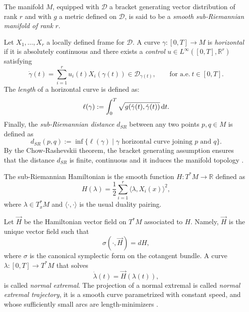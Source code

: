 \documentclass{amsart}
\theoremstyle{plain}
\theoremstyle{definition}
\theoremstyle{remark}
\newcommand{\R}{\mathbb{R}}
\newcommand{\diff}{d}%
\newcommand{\de}{\,{\rm d}}											%
\newcommand{\la}{\langle}
\newcommand{\ra}{\rangle}
\newcommand{\sr}{sub-{R}ie\-man\-nian }
\newcommand{\distr}{\mathcal{D}}								%
\begin{document}
The manifold $M$, equipped with $\distr$ a bracket generating vector distribution of rank $r$ and with $g$ a metric defined on $\distr$, is said to be a \emph{smooth \sr manifold of rank $r$}. 

Let $X_1,\ldots,X_r$ a locally defined frame for $\distr$. 
A curve $\gamma : [0,T] \to M$ is \emph{horizontal} if it is absolutely continuous and there exists a \emph{control} $u\in L^\infty([0,T],\R^r)$ satisfying
\begin{equation}
\label{eq:control}
\dot\gamma(t)=\sum_{i=1}^r u_i(t) X_i(\gamma(t))\in \distr_{\gamma(t)}, \qquad \text{for a.e.}\ t \in [0,T].
\end{equation}
The \emph{length} of a horizontal curve is defined as:
\begin{equation}
\ell(\gamma) := \int_0^T \sqrt{g(\dot\gamma(t),\dot\gamma(t))} \de t.
\end{equation}
Finally, the \emph{\sr distance} $d_{SR}$ between any two points $p,q\in
 M$ is defined as
\begin{equation}\label{eq:infimo}
d_{SR} (p,q) := \inf\{\ell(\gamma) \mid  \gamma \text{ horizontal curve joining $p$ and $q$} \}.
\end{equation}
By the Chow-Rashevskii theorem, the bracket generating assumption ensures that the distance $d_{SR}$ is finite, continuous and it induces the manifold topology \cite[Chapter 3]{thebook}.

The \sr Hamiltonian is the smooth function $H:T^*M\to\R$ defined as
\begin{equation}
\label{eq:hamiltonian}
 H(\lambda)=\frac12\sum_{i=1}^r\la \lambda ,X_i(x)\ra ^2,
\end{equation} 
 where $\lambda\in T^*_xM$ and $\la\cdot,\cdot\ra$ is the usual duality pairing. 

Let $\vec{H}$ be the Hamiltonian vector field on $T^*M$ associated to $H$. Namely, $\vec{H}$ is the unique vector field such that 
\begin{equation}\label{eq:db15H}
\sigma(\cdot,\vec H) = \diff H,
\end{equation}
where $\sigma$ is the canonical symplectic form on the cotangent bundle.
A curve $\lambda:[0,T]\to T^*M$ that solves 
\begin{equation}
\label{eq:hamiltoniandynamics}
	\dot\lambda (t) = \vec{H}(\lambda(t)),
\end{equation} 
is called \emph{normal extremal}.
The projection of a normal extremal is called \emph{normal extremal trajectory}, it is a smooth curve parametrized with constant speed, and whose sufficiently small arcs are length-minimizers \cite[Chapter 4]{thebook}. 
\end{document}
